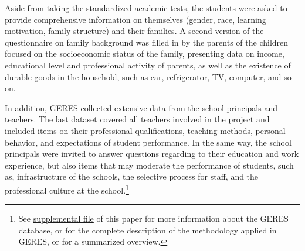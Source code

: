 \documentclass[a4paper, 12pt]{article}
\begin{document}



Aside from taking the standardized academic tests, the students were asked to provide comprehensive information on themselves (gender, race, learning motivation, family structure) and their families. A second version of the questionnaire on family background was filled in by the parents of the children focused on the socioeconomic status of the family, presenting data on income, educational level and professional activity of parents, as well as the existence of durable goods in the household, such as car, refrigerator, TV, computer, and so on.

In addition, GERES collected extensive data from the school principals and teachers. The last dataset covered all teachers involved in the project and included items on their professional qualifications, teaching methods, personal behavior, and expectations of student performance. In the same way, the school principals were invited to answer questions regarding to their education and work experience, but also items that may moderate the performance of students, such as, infrastructure of the schools, the selective process for staff, and the professional culture at the school.\footnote{See \hyperref[SuppMaterial]{supplemental file} of this paper for more information about the GERES database, or \citet{brooke2011geres} for the complete description of the methodology applied in GERES, or \citet{franco2008estudo} for a summarized overview.}
\end{document}
